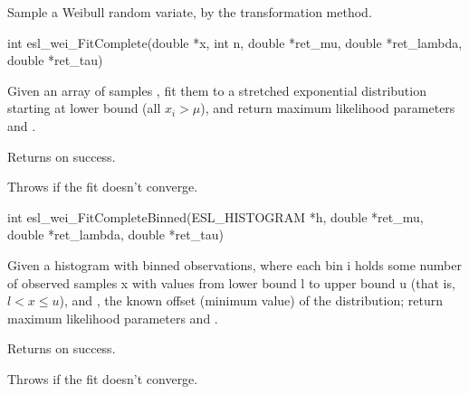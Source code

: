 \begin{sreapi}
Sample a Weibull random variate,
by the transformation method.


\hypertarget{func:esl_wei_FitComplete()}
{\item[int esl\_wei\_FitComplete(double *x, int n, double *ret\_mu,
		    double *ret\_lambda, double *ret\_tau)]}

Given an array of  samples \ccode{x[0]..x[n-1}, fit
them to a stretched exponential distribution starting
at lower bound  (all $x_i > \mu$), and 
return maximum likelihood parameters 
and .

Returns  on success.

Throws  if the fit doesn't converge.



\hypertarget{func:esl_wei_FitCompleteBinned()}
{\item[int esl\_wei\_FitCompleteBinned(ESL\_HISTOGRAM *h, double *ret\_mu,
			  double *ret\_lambda, double *ret\_tau)]}

Given a histogram  with binned observations, where each
bin i holds some number of observed samples x with values from 
lower bound l to upper bound u (that is, $l < x \leq u$), and
, the known offset (minimum value) of the distribution;
return maximum likelihood parameters 
and .

Returns  on success.

Throws  if the fit doesn't converge.



\end{sreapi}

